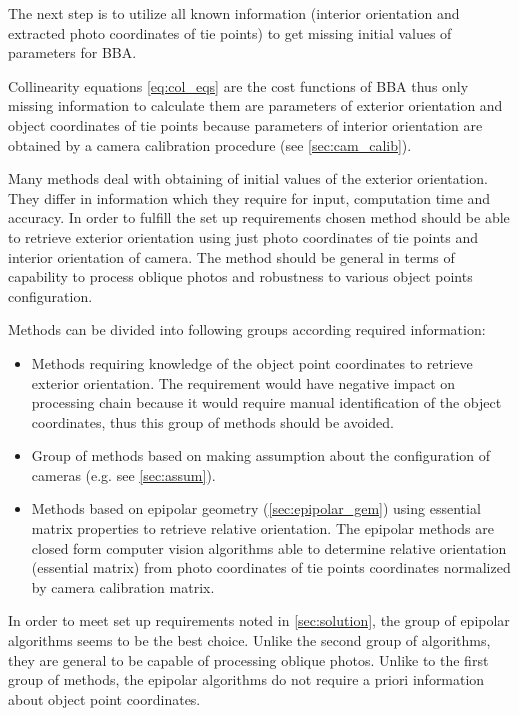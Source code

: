 \documentclass[a4paper,12pt]{article}
\begin{document}
The next step is to utilize all known information (interior orientation and extracted 
photo coordinates of tie points) to get missing initial values of parameters for BBA. 

Collinearity equations \eqref{eq:col_eqs} are the cost functions of BBA thus only missing information 
to calculate them 
are parameters of exterior orientation and object coordinates of 
tie points because 
parameters of interior orientation are obtained by a camera calibration procedure (see \ref{sec:cam_calib}).

Many methods deal with obtaining of initial values of the exterior orientation. They 
differ in information which they require for input, computation time and accuracy. 
In order to fulfill the set up requirements chosen method should be able to retrieve exterior orientation 
using just photo coordinates of tie points and interior orientation of camera. The method 
should be general in terms of capability to process oblique photos and robustness to 
various object points configuration.

Methods can be divided into following groups according required information:
\begin{itemize}
\item Methods requiring knowledge of the object point coordinates to retrieve exterior
orientation. The requirement would have negative impact on processing 
chain because it would require manual identification of the object coordinates,
thus this group of methods should be avoided. 
\item Group of  methods based on making assumption about the configuration of cameras (e.g. see \ref{sec:assum}).  
\item Methods based on epipolar geometry (\ref{sec:epipolar_gem}) using essential matrix properties to 
retrieve relative orientation.
The epipolar methods are closed form computer vision algorithms
able to determine relative orientation (essential matrix) from photo coordinates 
of tie points coordinates normalized by camera calibration matrix. 
\end{itemize}

In order to meet set up requirements noted in \ref{sec:solution}, the group of epipolar 
algorithms seems to be the best choice. Unlike the second group of algorithms,
they are general to be capable of processing oblique photos. Unlike
to the first group of methods, the epipolar algorithms
do not require a priori information about object point coordinates.
\end{document}
